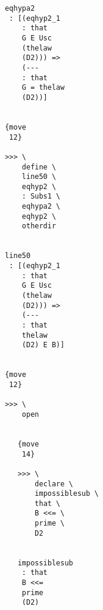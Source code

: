 \documentclass[12pt]{article}
\begin{document}
\begin{verbatim}
                                       eqhypa2 
                                        : [(eqhyp2_1 
                                           : that 
                                           G E Usc 
                                           (thelaw 
                                           (D2))) => 
                                           (--- 
                                           : that 
                                           G = thelaw 
                                           (D2))]


                                       {move 
                                        12}

                                       >>> \
                                           define \
                                           line50 \
                                           eqhyp2 \
                                           : Subs1 \
                                           eqhypa2 \
                                           eqhyp2 \
                                           otherdir


                                       line50 
                                        : [(eqhyp2_1 
                                           : that 
                                           G E Usc 
                                           (thelaw 
                                           (D2))) => 
                                           (--- 
                                           : that 
                                           thelaw 
                                           (D2) E B)]


                                       {move 
                                        12}

                                       >>> \
                                           open


                                          {move 
                                           14}

                                          >>> \
                                              declare \
                                              impossiblesub \
                                              that \
                                              B <<= \
                                              prime \
                                              D2


                                          impossiblesub 
                                           : that 
                                           B <<= 
                                           prime 
                                           (D2)



\end{verbatim}
\end{document}
